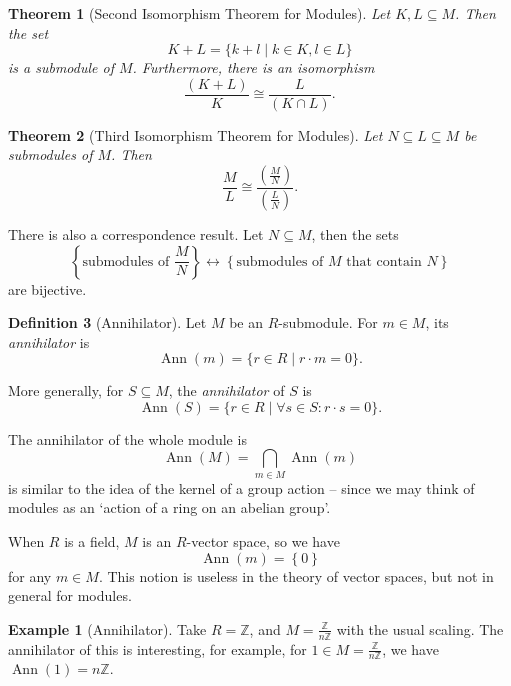 \documentclass{article}
\newtheorem{theorem}{Theorem}[section]
\theoremstyle{definition}
\newtheorem{definition}[theorem]{Definition}
\newtheorem*{example*}{Example}
\theoremstyle{remark}
\newcommand{\pqty}[1]{\left(#1\right)}
\newcommand{\Bqty}[1]{\left\{#1\right\}}
\newcommand{\set}[2]{\{#1\mid #2\}}
\newcommand{\flatfrac}[2]{\frac{#1}{#2}}
\newcommand{\isomorphic}{\cong}
\newcommand{\submodule}{\subseteq}
\newcommand{\ZZ}{\mathbb{Z}}
\newcommand{\Ann}{\operatorname{Ann}}
\begin{document}
\begin{theorem}[Second Isomorphism Theorem for Modules]
    \label{thm:second-isomorphism-theorem-modules}%
    Let \(K, L \submodule M\). Then the set
    \[
        K + L = \set{k + l}{k \in K, l \in L}
    \]
    is a submodule of \(M\). Furthermore, there is an isomorphism
    \[
        \flatfrac{\pqty{K + L}}{K} \isomorphic \flatfrac{L}{\pqty{K \cap L}}.
    \]
\end{theorem}

\begin{theorem}[Third Isomorphism Theorem for Modules]
    \label{thm:third-isomorphism-theorem-modules}%
    Let \(N \submodule L \submodule M\) be submodules of \(M\). Then
    \[
        \flatfrac{M}{L} \isomorphic \flatfrac{\pqty{\flatfrac{M}{N}}}{\pqty{\flatfrac{L}{N}}}.
    \]
\end{theorem}

There is also a correspondence result. Let \(N \submodule M\), then the sets
\[
    \Bqty{\text{submodules of }\flatfrac{M}{N}} \leftrightarrow \Bqty{\text{submodules of }M\text{ that contain }N}
\]
are bijective.

\begin{definition}[Annihilator]
    \label{def:annihiliator}%
    Let \(M\) be an \(R\)-submodule. For \(m \in M\), its \emph{annihilator} is
    \[
        \Ann\pqty{m} = \set{r \in R}{r \cdot m = 0}.
    \]

    More generally, for \(S \subseteq M\), the \emph{annihilator} of \(S\) is
    \[
        \Ann\pqty{S} = \set{r \in R}{\forall s \in S: r \cdot s = 0}.
    \]
\end{definition}

The annihilator of the whole module is
\[
    \Ann\pqty{M} = \bigcap_{m \in M} \Ann\pqty{m}
\]
is similar to the idea of the kernel of a group action -- since we may think of modules as an `action of a ring on an abelian group'.

When \(R\) is a field, \(M\) is an \(R\)-vector space, so we have
\[
    \Ann\pqty{m} = \Bqty{0}
\]
for any \(m \in M\). This notion is useless in the theory of vector spaces, but not in general for modules.

\begin{example*}[Annihilator]
    Take \(R = \ZZ\), and \(M = \flatfrac{\ZZ}{n\ZZ}\) with the usual scaling. The annihilator of this is interesting, for example, for \(1 \in M = \flatfrac{\ZZ}{n\ZZ}\), we have \(\Ann\pqty{1} = n\ZZ\).
\end{example*}
\end{document}

